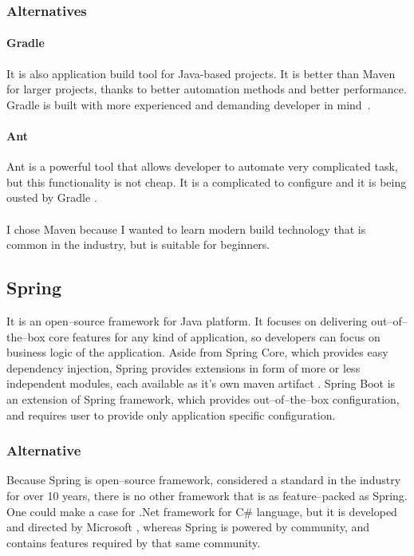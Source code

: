 \documentclass[a4paper,twoside,12pt]{book}
\begin{document}
      \subsubsection{Alternatives}
        \paragraph{Gradle}
          It is also application build tool for Java-based projects. It is better than Maven for larger projects, thanks to better automation methods and better performance.
          Gradle is built with more experienced and demanding developer in mind~\cite{bib:gradle}.
        
        \paragraph{Ant}
          Ant is a powerful tool that allows developer to automate very complicated task, but this functionality is not cheap.
          It is a complicated to configure and it is being ousted by Gradle \cite{bib:ant}.

      \paragraph{} %
      I chose Maven because I wanted to learn modern build technology that is common in the industry, but is suitable for beginners.

    \subsection{Spring}
      It is an open--source framework for Java platform. It focuses on delivering out--of--the--box core features for any kind of application, 
      so developers can focus on business logic of the application. 
      Aside from Spring Core, which provides easy dependency injection, Spring provides extensions in form of more or less independent modules, each available as it's own maven artifact \cite{bib:spring}.
      Spring Boot is an extension of Spring framework, which provides out--of--the--box configuration, and requires user to provide only application specific configuration.
      
      \subsubsection{Alternative}
        Because Spring is open--source framework, considered a standard in the industry for over 10 years, there is no other framework that is as feature--packed as Spring.
        One could make a case for .Net framework for C\# language, but it is developed and directed by Microsoft \cite{bib:thai2003net}, 
        whereas Spring is powered by community, and contains features required by that same community. 
\end{document}
